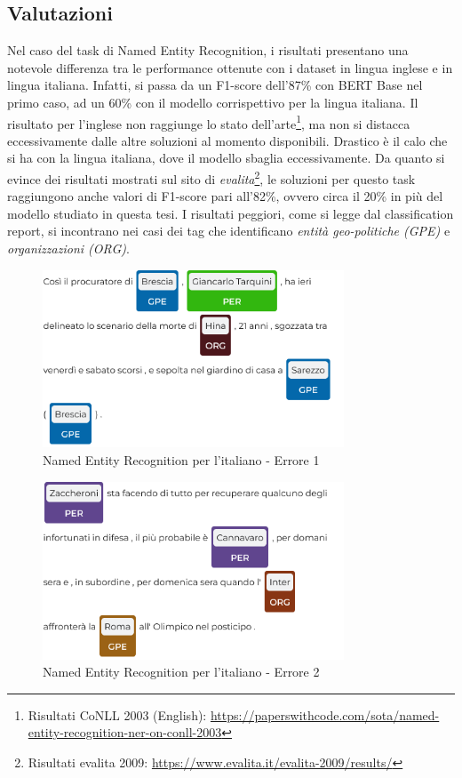 \subsection{Valutazioni}
Nel caso del task di Named Entity Recognition, i risultati presentano una notevole differenza tra le performance ottenute con i dataset in lingua inglese e in lingua italiana. Infatti, si passa da un F1-score dell'87\% con BERT Base nel primo caso, ad un 60\% con il modello corrispettivo per la lingua italiana. Il risultato per l'inglese non raggiunge lo stato dell'arte\footnote{Risultati CoNLL 2003 (English): \href{https://paperswithcode.com/sota/named-entity-recognition-ner-on-conll-2003}{https://paperswithcode.com/sota/named-entity-recognition-ner-on-conll-2003}}, ma non si distacca eccessivamente dalle altre soluzioni al momento disponibili. Drastico è il calo che si ha con la lingua italiana, dove il modello sbaglia eccessivamente. Da quanto si evince dei risultati mostrati sul sito di \textit{evalita}\footnote{Risultati evalita 2009: \href{https://www.evalita.it/evalita-2009/results/}{https://www.evalita.it/evalita-2009/results/}}, le soluzioni per questo task raggiungono anche valori di F1-score pari all'82\%, ovvero circa il 20\% in più del modello studiato in questa tesi. I risultati peggiori, come si legge dal classification report, si incontrano nei casi dei tag che identificano \textit{entità geo-politiche (GPE)} e \textit{organizzazioni (ORG)}.
\begin{figure}[ht!]
    \centering
    \includegraphics[width=0.8\textwidth]{img/errori_ner_ita/errore1.png}
    \caption{Named Entity Recognition per l'italiano - Errore 1}
    \label{fig:ner_errore1}
\end{figure}
\begin{figure}[ht!]
    \centering
    \includegraphics[width=0.8\textwidth]{img/errori_ner_ita/errore2.png}
    \caption{Named Entity Recognition per l'italiano - Errore 2}
    \label{fig:ner_errore2}
\end{figure} \newpage
